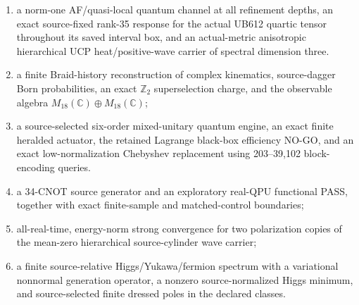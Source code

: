 \documentclass[11pt]{article}
\theoremstyle{definition}
\theoremstyle{remark}
\begin{document}
\begin{enumerate}
\item a norm-one AF/quasi-local quantum channel at all refinement depths, an exact source-fixed rank-35 response for the actual UB612 quartic tensor throughout its saved interval box, and an actual-metric anisotropic hierarchical UCP heat/positive-wave carrier of spectral dimension three.
\item a finite Braid-history reconstruction of complex kinematics, source-dagger Born probabilities, an exact $\mathbb Z_2$ superselection charge, and the observable algebra $M_{18}(\mathbb C)\oplus M_{18}(\mathbb C)$;
\item a source-selected six-order mixed-unitary quantum engine, an exact finite heralded actuator, the retained Lagrange black-box efficiency NO-GO, and an exact low-normalization Chebyshev replacement using 203--39,102 block-encoding queries.
\item a 34-CNOT source generator and an exploratory real-QPU functional PASS, together with exact finite-sample and matched-control boundaries;
\item all-real-time, energy-norm strong convergence for two polarization copies of the mean-zero hierarchical source-cylinder wave carrier;
\item a finite source-relative Higgs/Yukawa/fermion spectrum with a variational nonnormal generation operator, a nonzero source-normalized Higgs minimum, and source-selected finite dressed poles in the declared classes.
\end{enumerate}
\end{document}
